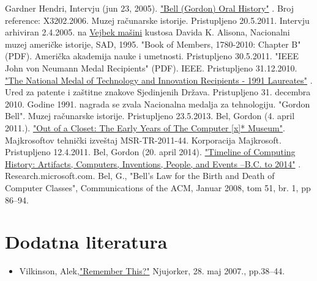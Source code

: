 \documentclass[a4paper]{article}
\begin{document}
{\appendix
\renewcommand{\refname}{Reference}
\begin{thebibliography}{9}
 Gardner Hendri, Intervju (jun 23, 2005). \href{https://computerhistory.org/collections/accession/102702036}{"Bell (Gordon) Oral History"} . Broj reference: X3202.2006. Muzej računarske istorije. Pristupljeno 20.5.2011. 
 Intervju arhiviran 2.4.2005. na \href{https://sr.wikipedia.org/wiki/Wayback_Machine}{Vejbek mašini} kustosa Davida K. Alisona, Nacionalni muzej američke istorije, SAD, 1995.
  "Book of Members, 1780-2010: Chapter B" (PDF). Američka akademija nauke i umetnosti. Pristupljeno 30.5.2011.
 "IEEE John von Neumann Medal Recipients" (PDF). IEEE. Pristupljeno 31.12.2010.
 \href{https://www.uspto.gov/learning-and-resources/ip-programs-and-awards/national-medal-technology-and-innovation-nmti}{ "The National Medal of Technology and Innovation Recipients - 1991 Laureates"} . Ured za patente i zaštitne znakove Sjedinjenih Država. Pristupljeno 31. decembra 2010. Godine 1991. nagrada se zvala Nacionalna medalja za tehnologiju.
 "Gordon Bell". Muzej računarske istorije. Pristupljeno 23.5.2013.
  Bel, Gordon (4. april 2011.). \href{https://www.microsoft.com/en-us/research/publication/out-of-a-closet-the-early-years-of-years-of-the-computer-x-museums/}{"Out of a Closet: The Early Years of The Computer [x]* Museum"}. Majkrosoftov tehnički izveštaj MSR-TR-2011-44. Korporacija Majkrosoft. Pristupljeno 12.4.2011.
 Bel, Gordon (20. april 2014). \href{https://gordonbell.azurewebsites.net/}{"Timeline of Computing History: Artifacts, Computers, Inventions, People, and Events --B.C. to 2014"} . Research.microsoft.com.
  Bel, G., "Bell’s Law for the Birth and Death of Computer Classes", Communications of the ACM, Januar 2008, tom 51, br. 1, pp 86–94. 
 

\end{thebibliography}

\section{Dodatna literatura}
\label{sec:naslov1}
\begin{itemize}
\item Vilkinson, Alek,\href{https://www.newyorker.com/magazine/2007/05/28/remember-this}{"Remember This?"}  Njujorker, 28. maj 2007., pp.38–44.

\end{itemize} 

}
\end{document}
